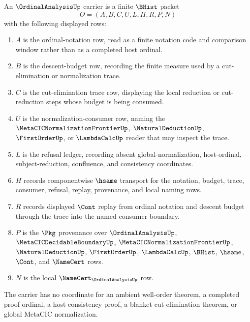 \begin{definition}
\label{def:ordinal-analysis-carrier}
An $\OrdinalAnalysisUp$ carrier is a finite $\BHist$ packet
$$
O=(A,B,C,U,L,H,R,P,N)
$$
with the following displayed rows:
\begin{enumerate}
\item $A$ is the ordinal-notation row, read as a finite notation code and comparison window rather than as a completed host ordinal.
\item $B$ is the descent-budget row, recording the finite measure used by a cut-elimination or normalization trace.
\item $C$ is the cut-elimination trace row, displaying the local reduction or cut-reduction steps whose budget is being consumed.
\item $U$ is the normalization-consumer row, naming the $\MetaCICNormalizationFrontierUp$, $\NaturalDeductionUp$, $\FirstOrderUp$, or $\LambdaCalcUp$ reader that may inspect the trace.
\item $L$ is the refusal ledger, recording absent global-normalization, host-ordinal, subject-reduction, confluence, and consistency coordinates.
\item $H$ records componentwise $\hsame$ transport for the notation, budget, trace, consumer, refusal, replay, provenance, and local naming rows.
\item $R$ records displayed $\Cont$ replay from ordinal notation and descent budget through the trace into the named consumer boundary.
\item $P$ is the $\Pkg$ provenance over $\OrdinalAnalysisUp$, $\MetaCICDecidableBoundaryUp$, $\MetaCICNormalizationFrontierUp$, $\NaturalDeductionUp$, $\FirstOrderUp$, $\LambdaCalcUp$, $\BHist$, $\hsame$, $\Cont$, and $\NameCert$ rows.
\item $N$ is the local $\NameCert_{\OrdinalAnalysisUp}$ row.
\end{enumerate}
The carrier has no coordinate for an ambient well-order theorem, a completed proof ordinal, a host consistency proof, a blanket cut-elimination theorem, or global MetaCIC normalization.
\end{definition}

